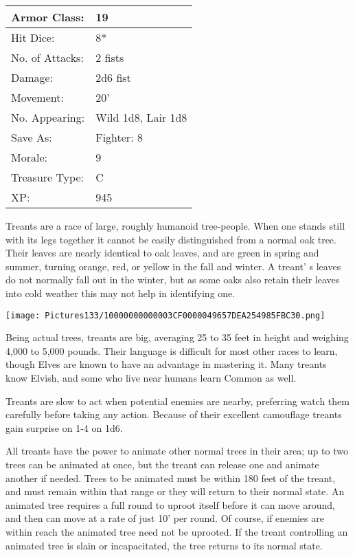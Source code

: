 \documentclass[a4paper,twoside,openany,10pt]{book}
\begin{document}
\begin{multicols}{2}
\begin{tabularx}{0.50\textwidth}{@{}lX@{}}
Armor Class: & 19 \\\hline
Hit Dice: & 8* \\\hline
No. of Attacks: & 2 fists \\\hline
Damage: & 2d6 fist \\\hline
Movement: & 20' \\\hline
No. Appearing: & Wild 1d8, Lair 1d8 \\\hline
Save As: & Fighter: 8 \\\hline
Morale: & 9 \\\hline
Treasure Type: & C \\\hline
XP: & 945 \\\hline
\end{tabularx}\medskip

Treants are a race of large, roughly humanoid tree-people. When one stands still with its legs together it cannot be easily distinguished from a normal oak tree. Their leaves are nearly identical to oak leaves, and are green in spring and summer, turning orange, red, or yellow in the fall and winter. A treant' s leaves do not normally fall out in the winter, but as some oaks also retain their leaves into cold weather this may not help in identifying one.

\begin{center} \texttt{[image: Pictures133/10000000000003CF0000049657DEA254985FBC30.png]} \end{center}

Being actual trees, treants are big, averaging 25 to 35 feet in height and weighing 4,000 to 5,000 pounds. Their language is difficult for most other races to learn, though Elves are known to have an advantage in mastering it. Many treants know Elvish, and some who live near humans learn Common as well.

Treants are slow to act when potential enemies are nearby, preferring watch them carefully before taking any action. Because of their excellent camouflage treants gain surprise on 1-4 on 1d6.

All treants have the power to animate other normal trees in their area; up to two trees can be animated at once, but the treant can release one and animate another if needed. Trees to be animated must be within 180 feet of the treant, and must remain within that range or they will return to their normal state. An animated tree requires a full round to uproot itself before it can move around, and then can move at a rate of just 10' per round. Of course, if enemies are within reach the animated tree need not be uprooted. If the treant controlling an animated tree is slain or incapacitated, the tree returns to its normal state.


\end{multicols}
\end{document}
